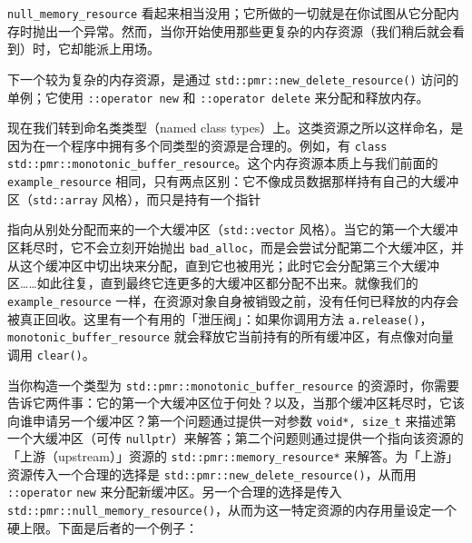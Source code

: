 \texttt{null\_\allowbreak{}memory\_\allowbreak{}resource} 看起来相当没用；它所做的一切就是在你试图从它分配内存时抛出一个异常。然而，当你开始使用那些更复杂的内存资源（我们稍后就会看到）时，它却能派上用场。

下一个较为复杂的内存资源，是通过 \texttt{std::\allowbreak{}pmr::\allowbreak{}new\_\allowbreak{}delete\_\allowbreak{}resource(\allowbreak{})\allowbreak{}} 访问的单例；它使用 \texttt{::\allowbreak{}operator new} 和 \texttt{::\allowbreak{}operator delete} 来分配和释放内存。

现在我们转到命名类类型（named class types）上。这类资源之所以这样命名，是因为在一个程序中拥有多个同类型的资源是合理的。例如，有 \texttt{class std::\allowbreak{}pmr::\allowbreak{}monotonic\_\allowbreak{}buffer\_\allowbreak{}resource}。这个内存资源本质上与我们前面的 \texttt{example\_\allowbreak{}resource} 相同，只有两点区别：它不像成员数据那样持有自己的大缓冲区（\texttt{std::\allowbreak{}array} 风格），而只是持有一个指针

指向从别处分配而来的一个大缓冲区（\texttt{std::\allowbreak{}vector} 风格）。当它的第一个大缓冲区耗尽时，它不会立刻开始抛出 \texttt{bad\_\allowbreak{}alloc}，而是会尝试分配第二个大缓冲区，并从这个缓冲区中切出块来分配，直到它也被用光；此时它会分配第三个大缓冲区……如此往复，直到最终它连更多的大缓冲区都分配不出来。就像我们的 \texttt{example\_\allowbreak{}resource} 一样，在资源对象自身被销毁之前，没有任何已释放的内存会被真正回收。这里有一个有用的「泄压阀」：如果你调用方法 \texttt{a.\allowbreak{}release(\allowbreak{})\allowbreak{}}，\texttt{monotonic\_\allowbreak{}buffer\_\allowbreak{}resource} 就会释放它当前持有的所有缓冲区，有点像对向量调用 \texttt{clear(\allowbreak{})\allowbreak{}}。

当你构造一个类型为 \texttt{std::\allowbreak{}pmr::\allowbreak{}monotonic\_\allowbreak{}buffer\_\allowbreak{}resource} 的资源时，你需要告诉它两件事：它的第一个大缓冲区位于何处？以及，当那个缓冲区耗尽时，它该向谁申请另一个缓冲区？第一个问题通过提供一对参数 \texttt{void*,\allowbreak{} size\_\allowbreak{}t} 来描述第一个大缓冲区（可传 \texttt{nullptr}）来解答；第二个问题则通过提供一个指向该资源的「上游（upstream）」资源的 \texttt{std::\allowbreak{}pmr::\allowbreak{}memory\_\allowbreak{}resource*} 来解答。为「上游」资源传入一个合理的选择是 \texttt{std::\allowbreak{}pmr::\allowbreak{}new\_\allowbreak{}delete\_\allowbreak{}resource(\allowbreak{})\allowbreak{}}，从而用 \texttt{::\allowbreak{}operator} \texttt{new} 来分配新缓冲区。另一个合理的选择是传入 \texttt{std::\allowbreak{}pmr::\allowbreak{}null\_\allowbreak{}memory\_\allowbreak{}resource(\allowbreak{})\allowbreak{}}，从而为这一特定资源的内存用量设定一个硬上限。下面是后者的一个例子：

